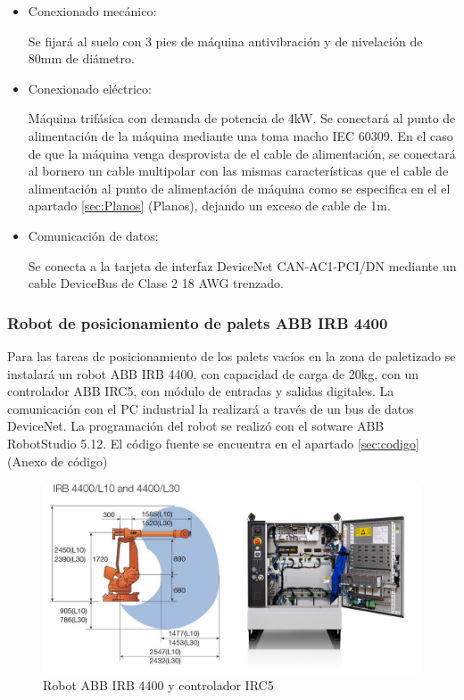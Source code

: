 		\begin{itemize}
				\item{Conexionado mecánico:}
				
				Se fijará al suelo con 3 pies de máquina antivibración y de nivelación de 80mm de diámetro.

				\item{Conexionado eléctrico:}

				Máquina trifásica con demanda de potencia de 4kW. Se conectará al punto de alimentación de la máquina mediante una  toma macho IEC 60309. En el caso de que la máquina venga desprovista de el cable de alimentación, se conectará al bornero un cable multipolar con las mismas características que el cable de alimentación al punto de alimentación de máquina como se especifica en el el apartado \ref{sec:Planos} (Planos), dejando un exceso de cable de 1m. \	
							
				\item{Comunicación de datos:}

				Se conecta a la tarjeta de interfaz DeviceNet CAN-AC1-PCI/DN mediante un cable DeviceBus de Clase 2 18 AWG trenzado.
		\end{itemize}
\newpage

	\subsubsection{Robot de posicionamiento de palets ABB IRB 4400}

	
	
	Para las tareas de posicionamiento de los palets vacíos en la zona de paletizado se instalará un robot ABB IRB 4400, con capacidad de carga de 20kg, con un controlador ABB IRC5, con módulo de entradas y salidas digitales. La comunicación con el PC industrial la realizará a través de un bus de datos DeviceNet. La programación del robot se realizó con el sotware ABB RobotStudio 5.12. El código fuente se encuentra en el apartado \ref{sec:codigo} (Anexo de código)\
	

	\begin{figure}[htp]
		
			\centering
			\includegraphics[scale=0.4]{Datasheets/9Foto.jpg}
			\caption{Robot ABB IRB 4400 y controlador IRC5}
			\label{fig:testa}
		
	\end{figure}	
	

